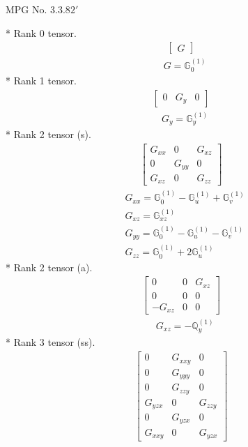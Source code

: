 \documentclass[fleqn,8pt,landscape]{jsarticle}
\begin{document}
\setcounter{MaxMatrixCols}{32}

\renewcommand{\tablename}{Table~}
\renewcommand{\figurename}{Figure~}
\begin{center}
\LARGE
MPG No. 3.3.8\quad$2'$
\end{center}
* Rank 0 tensor.
\begin{align*}
\begin{bmatrix} G \end{bmatrix}
\end{align*}
\begin{align*}
& G = \mathbb{G}_{0}^{(1)}
\end{align*}
* Rank 1 tensor.
\begin{align*}
\begin{bmatrix} 0 & G_{y} & 0 \end{bmatrix}
\end{align*}
\begin{align*}
& G_{y} = \mathbb{G}_{y}^{(1)}
\end{align*}
* Rank 2 tensor (s).
\begin{align*}
\begin{bmatrix} G_{xx} & 0 & G_{xz} \\ 0 & G_{yy} & 0 \\ G_{xz} & 0 & G_{zz} \end{bmatrix}
\end{align*}
\begin{align*}
& G_{xx} = \mathbb{G}_{0}^{(1)} - \mathbb{G}_{u}^{(1)} + \mathbb{G}_{v}^{(1)} \\
& G_{xz} = \mathbb{G}_{xz}^{(1)} \\
& G_{yy} = \mathbb{G}_{0}^{(1)} - \mathbb{G}_{u}^{(1)} - \mathbb{G}_{v}^{(1)} \\
& G_{zz} = \mathbb{G}_{0}^{(1)} + 2 \mathbb{G}_{u}^{(1)}
\end{align*}
* Rank 2 tensor (a).
\begin{align*}
\begin{bmatrix} 0 & 0 & G_{xz} \\ 0 & 0 & 0 \\ - G_{xz} & 0 & 0 \end{bmatrix}
\end{align*}
\begin{align*}
& G_{xz} = - \mathbb{Q}_{y}^{(1)}
\end{align*}
* Rank 3 tensor (ss).
\begin{align*}
\begin{bmatrix} 0 & G_{xxy} & 0 \\ 0 & G_{yyy} & 0 \\ 0 & G_{zzy} & 0 \\ G_{yzx} & 0 & G_{zzy} \\ 0 & G_{yzx} & 0 \\ G_{xxy} & 0 & G_{yzx} \end{bmatrix}
\end{align*}
\end{document}
